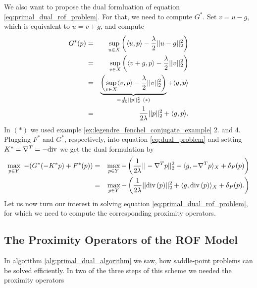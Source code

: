 \documentclass{scrreprt}
\begin{document}
            We also want to propose the dual formluation of equation \ref{eq:primal_dual_rof_problem}. For that, we need to compute $G^{\ast}$. Set $v = u - g$, which is equivalent to $u = v + g$, and compute
                \begin{eqnarray}
                    G^{\ast}(p) &=& \sup_{u \in X} \left( \langle u, p \rangle - \frac{\lambda}{2} ||u - g||_{2}^{2} \right) \notag \\
                    &=& \sup_{v \in X} \left( \langle v + g, p \rangle - \frac{\lambda}{2} ||v||_{2}^{2} \right) \notag \\
                    &=& \underbrace{\left( \sup_{v \in X} \langle v, p \rangle - \frac{\lambda}{2} ||v||_{2}^{2} \right)}_{= \frac{1}{2\lambda} ||p||_{2}^{2} \,\,\, (\ast)} + \langle g, p \rangle \notag \\
                    &=& \frac{1}{2\lambda} ||p||_{2}^{2} + \langle g, p \rangle. \notag
                \end{eqnarray}
            In $(\ast)$ we used example \ref{ex:legendre_fenchel_conjugate_example} 2. and 4. Plugging $F^{\ast}$ and $G^{\ast}$, respectively, into equation \ref{eq:dual_problem} and setting $K^{\ast} = \nabla^{T} = -\textnormal{div}$ we get the dual formulation by
                \begin{eqnarray}
                    \max_{p \in Y}\,\, -(G^{\ast}(-K^{\ast}p) + F^{\ast}(p)) &=& \max_{p \in Y} - \left( \frac{1}{2\lambda} ||-\nabla^{T}p||^{2}_{2} + \langle g, -\nabla^{T}p \rangle_{X} + \delta_{P}(p) \right) \notag \\
                    &=& \max_{p \in Y} - \left( \frac{1}{2\lambda} ||\textnormal{div}\,(p)||^{2}_{2} + \langle g, \textnormal{div}\,(p) \rangle_{X} + \delta_{P}(p). \right) \notag
                \end{eqnarray}
            Let us now turn our interest in solving equation \ref{eq:primal_dual_rof_problem}, for which we need to compute the corresponding proximity operators.


        \subsection{The Proximity Operators of the ROF Model} %
        \label{sub:the_proximity_operators_for_the_rof_model}

            In algorithm \ref{alg:primal_dual_algorithm} we saw, how saddle-point problems can be solved efficiently. In two of the three steps of this scheme we needed the proximity operators
\end{document}

